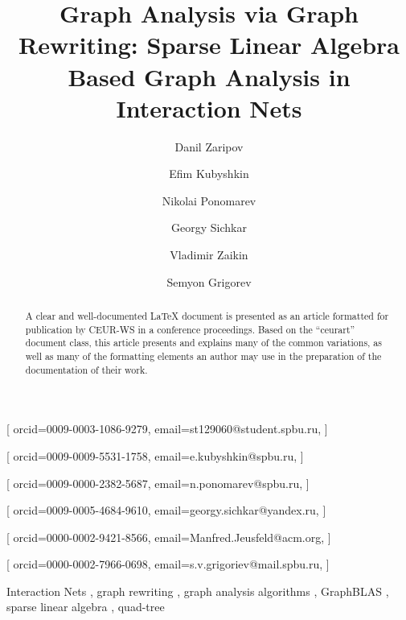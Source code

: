 \documentclass[
]{ceurart}
\begin{document}


\title{Graph Analysis via Graph Rewriting: Sparse Linear Algebra Based Graph Analysis in Interaction Nets}

\author[1]{Danil Zaripov}[%
orcid=0009-0003-1086-9279,
email=st129060@student.spbu.ru,
]
\cormark[1]

\author[1]{Efim Kubyshkin}[%
orcid=0009-0009-5531-1758,
email=e.kubyshkin@spbu.ru,
]

\author[1]{Nikolai Ponomarev}[%
orcid=0009-0000-2382-5687,
email=n.ponomarev@spbu.ru,
]

\author[1]{Georgy Sichkar}[%
orcid=0009-0005-4684-9610,
email=georgy.sichkar@yandex.ru,
]

\author[1]{Vladimir Zaikin}[%
orcid=0000-0002-9421-8566,
email=Manfred.Jeusfeld@acm.org,
]

\author[1]{Semyon Grigorev}[%
orcid=0000-0002-7966-0698,
email=s.v.grigoriev@mail.spbu.ru,
]


\address[1]{Saint Petersburg State University,
  7-9 Universitetskaya Embankment, St. Petersburg, 199034, Russia}




\begin{abstract}
  A clear and well-documented \LaTeX{} document is presented as an
  article formatted for publication by CEUR-WS in a conference
  proceedings. Based on the ``ceurart'' document class, this article
  presents and explains many of the common variations, as well as many
  of the formatting elements an author may use in the preparation of
  the documentation of their work.
\end{abstract}

\begin{keywords}
  Interaction Nets \sep
  graph rewriting \sep
  graph analysis algorithms \sep
  GraphBLAS \sep
  sparse linear algebra \sep
  quad-tree
\end{keywords}
\end{document}
